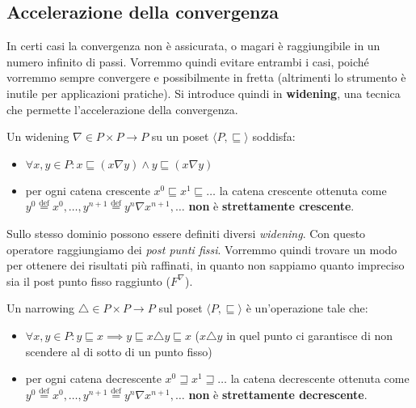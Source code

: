 \documentclass[a4paper,12pt,openany]{article}
\newenvironment{definition}[1][Definizione]{\begin{trivlist}
\item[\hskip \labelsep {\bfseries #1}]}{\end{trivlist}}
\begin{document}
\subsection{Accelerazione della convergenza}
In certi casi la convergenza non è assicurata, o magari è raggiungibile in un numero infinito di passi.
Vorremmo quindi evitare entrambi i casi, poiché vorremmo sempre convergere e possibilmente in fretta
(altrimenti lo strumento è inutile per applicazioni pratiche). Si introduce quindi in \textbf{widening},
una tecnica che permette l'accelerazione della convergenza.
\begin{definition}[Widening]
    Un widening $\nabla \in P \times P \to P$ su un poset $\langle P, \sqsubseteq \rangle$ soddisfa:
    \begin{itemize}
        \item $\forall x,y \in P : x \sqsubseteq (x \nabla y) \land y \sqsubseteq (x \nabla y)$
        \item per ogni catena crescente $x^0 \sqsubseteq x^1 \sqsubseteq \dots$ la catena crescente
            ottenuta come 
            $y^0 \overset{\mathrm{def}}{=} x^0, \dots, y^{n+1} 
            \overset{\mathrm{def}}{=} y^n \nabla x^{n+1}, \dots$
            \textbf{non} è \textbf{strettamente crescente}.
    \end{itemize}
\end{definition}
Sullo stesso dominio possono essere definiti diversi \emph{widening}. Con questo operatore raggiungiamo dei 
\emph{post punti fissi}. Vorremmo quindi trovare un modo per ottenere dei risultati più raffinati, in quanto
non sappiamo quanto impreciso sia il post punto fisso raggiunto ($F^\nabla$).
\begin{definition}[Narrowing]
    Un narrowing $\triangle \in P \times P \to P$ sul poset $\langle P, \sqsubseteq \rangle$ è un'operazione
    tale che:
    \begin{itemize}
        \item $\forall x,y \in P : y \sqsubseteq x \implies y \sqsubseteq x \triangle y \sqsubseteq x$
            ($ x \triangle y$ in quel punto ci garantisce di non scendere al di sotto di un punto fisso)
        \item per ogni catena decrescente $x^0 \sqsupseteq x^1 \sqsupseteq \dots$ la catena decrescente
            ottenuta come 
            $y^0 \overset{\mathrm{def}}{=} x^0, \dots, y^{n+1} 
            \overset{\mathrm{def}}{=} y^n \nabla x^{n+1}, \dots$
            \textbf{non} è \textbf{strettamente decrescente}.
    \end{itemize}
\end{definition}
\end{document}
